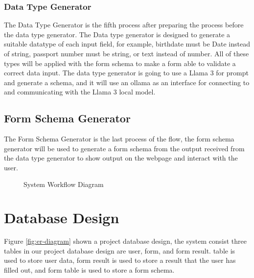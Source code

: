 \documentclass[12pt,oneside,openright,a4paper]{cpe-english-project}
\begin{document}
\subsubsection{Data Type Generator}

The Data Type Generator is the fifth process after preparing the process before the data type generator. The Data type generator is designed to generate a suitable datatype of each input field, for example, birthdate must be Date instead of string, passport number must be string, or text instead of number. All of these types will be applied with the form schema to make a form able to validate a correct data input. The data type generator is going to use a Llama 3 for prompt and generate a schema, and it will use an ollama as an interface for connecting to and communicating with the Llama 3 local model.

\subsection{Form Schema Generator}

The Form Schema Generator is the last process of the flow, the form schema generator will be used to generate a form schema from the output received from the data type generator to show output on the webpage and interact with the user.

\begin{figure}[!h]
\centering
{}
\caption{System Workflow Diagram}\label{fig:system-workflow}
\end{figure}

\newpage

\section{Database Design}

Figure \ref{fig:er-diagram} shown a project database design, the system consist three tables in our project database design are user, form, and form result. table is used to store user data, form result is used to store a result that the user has filled out, and form table is used to store a form schema.
\end{document}

